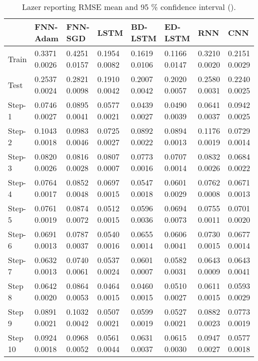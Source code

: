 \documentclass{ieeeaccess}
\begin{document}
\begin{table*}[htbp]
 \smaller 
 \caption{Lazer reporting RMSE mean and 95 \% confidence interval   ().}
\label{tab:lazer}
\begin{tabular}{llllllll}
\hline
 &  FNN-Adam& FNN-SGD & LSTM & BD-LSTM  & ED-LSTM & RNN &CNN\\
\hline
\hline
									
Train &  0.3371   0.0026 & 0.4251    0.0157  & 0.1954    0.0082  & 0.1619   0.0106 &  0.1166   0.0147  &  0.3210   0.0020  & 0.2151	0.0029\\

Test &  0.2537   0.0024 & 0.2821    0.0098  & 0.1910    0.0042  &  0.2007   0.0042 &  0.2020   0.0057  &  0.2580   0.0031  & 0.2240	0.0025\\

Step-1 &  0.0746   0.0027 & 0.0895    0.0041  & 0.0577    0.0021  &  0.0439   0.0027 & 0.0490   0.0039  &  0.0641   0.0037 & 0.0942	0.0025\\

Step-2 &  0.1043   0.0018 & 0.0983    0.0046  & 0.0725  0.0027  &  0.0892   0.0022 &  0.0894   0.0013  & 0.1176   0.0019  & 0.0729	0.0014\\

Step-3 &  0.0820  0.0026 & 0.0816    0.0028  & 0.0807    0.0007  &  0.0773  0.0016 & 0.0707   0.0014  & 0.0832  0.0026 & 0.0684	0.0022\\

Step-4 &  0.0764  0.0017 &0.0852    0.0048  &0.0697    0.0015  &  0.0547  0.0018 &  0.0601   0.0029  & 0.0762   0.0008  &	0.0671	0.0013 \\

Step-5 &  0.0761   0.0019 & 0.0874   0.0072  & 0.0512    0.0015  &  0.0596   0.0036 &  0.0694   0.0073  &  0.0755  0.0011 & 0.0701	0.0020\\

Step-6 &  0.0691   	0.0013 & 0.0787    0.0037  & 0.0540   0.0016 &  0.0655   	0.0014 &  0.0606   0.0041  & 0.0730   0.0015&  0.0677	0.0014 \\

Step-7 &  0.0632   0.0013 & 0.0740    	0.0061  & 0.0537    0.0024  & 0.0601   0.0007 &  0.0582   0.0031  &  0.0643  	0.0009& 	0.0643 	0.0041 \\

Step 8 &  
0.0642	 0.0020 & 
0.0864 	0.0053 & 
0.0464 	0.0015& 
0.0460 	0.0015& 
0.0510 	0.0027& 
0.0611 	0.0015& 0.0593	0.0029\\
Step 9 &  
0.0891	0.0021&
0.1032	0.0042&
0.0507	0.0021&
0.0599	0.0019&
0.0527	0.0021&
0.0882	0.0023& 0.0773	0.0019\\
Step 10 &  
0.0924	0.0018&
0.0968	0.0052&
0.0561	0.0044&
0.0631	0.0037&
0.0615	0.0030&
0.0947	0.0027& 0.0577	0.0018\\
\hline
 
\end{tabular}

\end{table*}
\end{document}
